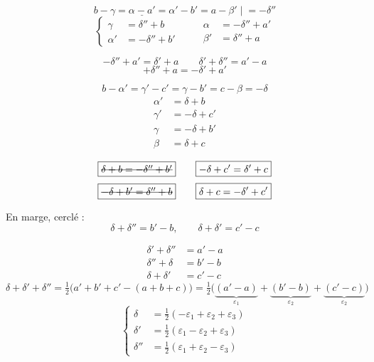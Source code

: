 \documentclass[11pt,a4paper]{article}
\begin{document}
\[
b - \gamma = \underline{\alpha - a'} = \alpha' - b' = a - \beta' \;\Big|\; = -\delta''
\]
\[
\left\{
\begin{aligned}
\gamma &= \delta'' + b\\
\alpha' &= -\delta'' + b'
\end{aligned}
\right.
\qquad
\begin{aligned}
\alpha &= -\delta'' + a'\\
\beta' &= \delta'' + a
\end{aligned}
\]

\[
\boxed{-\delta'' + a' = \delta' + a}\qquad \delta' + \delta'' = a' - a
\]
\[
\boxed{+\delta'' + a = -\delta' + a'}
\]

\[
b - \alpha' = \gamma' - c' = \gamma - b' = c - \beta = -\delta
\]
\begin{align*}
\alpha' &= \delta + b\\
\gamma' &= -\delta + c'\\
\gamma &= -\delta + b'\\
\beta &= \delta + c
\end{align*}

\[
\boxed{\text{\struck{$\delta + b = -\delta'' + b'$}}}\qquad
\boxed{-\delta + c' = \delta' + c}
\]
\[
\boxed{\text{\struck{$-\delta + b' = \delta'' + b$}}}\qquad
\boxed{\delta + c = -\delta' + c'}
\]

En marge, cerclé :
\[
\delta + \delta'' = b' - b,\qquad \delta + \delta' = c' - c
\]

\begin{align*}
\delta' + \delta'' &= a' - a\\
\delta'' + \delta &= b' - b\\
\delta + \delta' &= c' - c
\end{align*}
\[
\delta + \delta' + \delta'' = \tfrac12\bigl(a' + b' + c' - (a + b + c)\bigr)
= \tfrac12\bigl(\underbrace{(a'-a)}_{\varepsilon_1} + \underbrace{(b'-b)}_{\varepsilon_2} + \underbrace{(c'-c)}_{\varepsilon_2}\bigr)
\]
\[
\boxed{\left\{
\begin{aligned}
\delta &= \tfrac12(-\varepsilon_1 + \varepsilon_2 + \varepsilon_3)\\
\delta' &= \tfrac12(\varepsilon_1 - \varepsilon_2 + \varepsilon_3)\\
\delta'' &= \tfrac12(\varepsilon_1 + \varepsilon_2 - \varepsilon_3)
\end{aligned}
\right.}
\]
\end{document}
